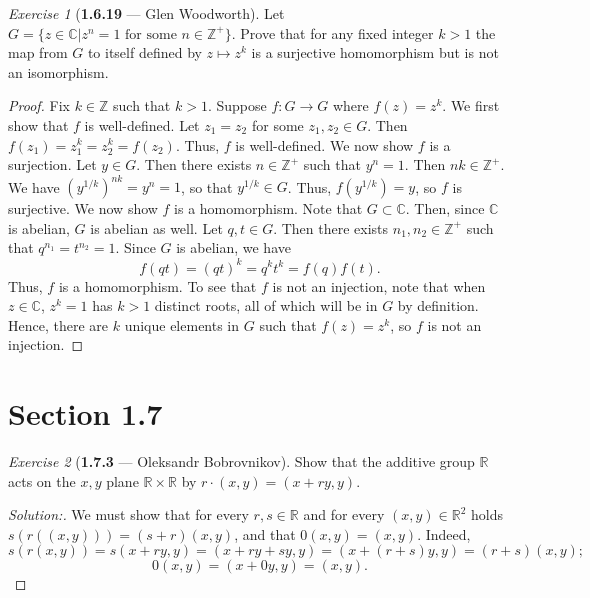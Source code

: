 \documentclass[12pt]{amsart}
\theoremstyle{remark}
\newtheorem*{exercise}{Exercise}%
\newcommand{\RR}{{\mathbb R}}
\newcommand{\ZZ}{{\mathbb Z}}
\newcommand{\CC}{{\mathbb C}}
\theoremstyle{mycomment}
\begin{document}
\begin{exercise}[\textbf{1.6.19} --- Glen Woodworth] Let $G=\{z\in\CC\vert z^n=1\text{ for some }n\in\ZZ^+\}$. Prove that for any fixed integer $k>1$ the map from $G$ to itself defined by $z\mapsto z^k$ is a surjective homomorphism but is not an isomorphism.
  \begin{proof} Fix $k\in\ZZ$ such that $k>1$. Suppose $f:G\rightarrow G$ where $f(z)=z^k$. We first show that $f$ is well-defined. Let $z_1=z_2$ for some $z_1,z_2\in G$. Then $f(z_1)=z_1^k=z_2^k=f(z_2)$. Thus, $f$ is well-defined. We now show $f$ is a surjection. Let $y\in G$. Then there exists $n\in\ZZ^+$ such that $y^n=1$. Then $nk\in\ZZ^+$. We have $(y^{1/k})^{nk}=y^n=1$, so that $y^{1/k}\in G$. Thus, $f(y^{1/k})=y$, so $f$ is surjective. We now show $f$ is a homomorphism. Note that $G\subset\CC$. Then, since $\CC$ is abelian, $G$ is abelian as well. Let $q,t\in G$. Then there exists $n_1,n_2\in\ZZ^+$ such that $q^{n_1}=t^{n_2}=1$. Since $G$ is abelian, we have 
  \[f(qt)=(qt)^{k}=q^{k}t^k=f(q)f(t).\]
  Thus, $f$ is a homomorphism. To see that $f$ is not an injection, note that when $z\in\CC$, $z^k=1$ has $k>1$ distinct roots, all of which will be in $G$ by definition. Hence, there are $k$ unique elements in $G$ such that $f(z)=z^k$, so $f$ is not an injection.
  \end{proof} 
\end{exercise}
  



\section*{\textbf{Section 1.7}}



\begin{exercise}[\textbf{1.7.3} --- Oleksandr Bobrovnikov]
  Show that the additive group $\RR$ acts on the $x,y$ plane $\RR\times\RR$ by $r\cdot(x,y)= (x+ry,y)$.
  \begin{proof}[Solution:]
    We must show that for every $r,s\in\RR$ and for every $(x,y)\in\RR^2$ holds $s(r((x,y)))=(s+r)(x,y)$, and that
    $0(x,y)=(x,y)$. Indeed,
    \begin{equation}
      s(r(x,y))=s(x+ry,y)=(x+ry+sy,y)=(x+(r+s)y,y)=(r+s)(x,y);
    \end{equation}
    \begin{equation}
      0(x,y)=(x+0y,y)=(x,y).
    \end{equation}
  \end{proof}
\end{exercise}
\vspace{.15in}
\end{document}
